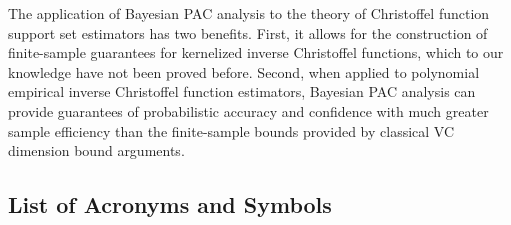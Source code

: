 \documentclass[onefignum,onetabnum]{siamart171218}
\begin{document}
The application of Bayesian PAC analysis to the theory of Christoffel function
support set estimators has two benefits. First, it allows for the construction
of finite-sample guarantees for kernelized inverse Christoffel functions, which
to our knowledge have not been proved before. Second, when applied to polynomial
empirical inverse Christoffel function estimators, Bayesian PAC analysis can
provide guarantees of probabilistic accuracy and confidence with much greater
sample efficiency than the finite-sample bounds provided by classical VC
dimension bound arguments.

\subsection{List of Acronyms and Symbols}%
\label{sub:list_of_notation}

\quad
\end{document}
